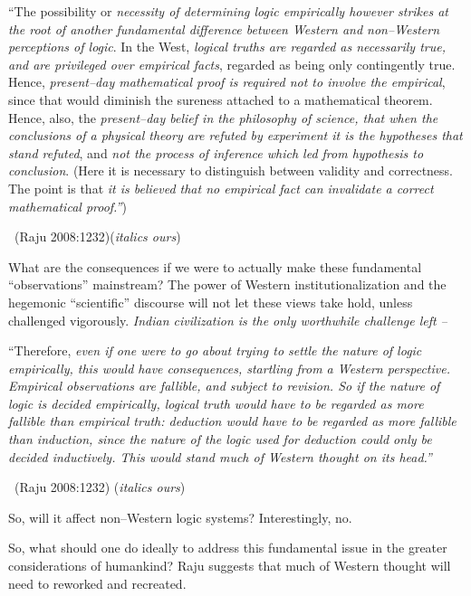 \begin{myquote}
“The possibility or \textit{necessity of determining logic empirically however strikes at the root of another fundamental difference between Western and non–Western perceptions of logic}. In the West, \textit{logical truths are regarded as necessarily true, and are privileged over empirical facts}, regarded as being only contingently true. Hence, \textit{present–day mathematical proof is required not to involve the empirical}, since that would diminish the sureness attached to a mathematical theorem. Hence, also, the \textit{present–day belief in the philosophy of science, that when the conclusions of a physical theory are refuted by experiment it is the hypotheses that stand refuted}, and \textit{not the process of inference which led from hypothesis to conclusion}. (Here it is necessary to distinguish between validity and correctness. The point is that \textit{it is believed that no empirical fact can invalidate a correct mathematical proof.”}) 

~\hfill (Raju 2008:1232)(\textit{italics ours})
\end{myquote}

What are the consequences if we were to actually make these fundamental “observations” mainstream? The power of Western institutionalization and the hegemonic “scientific” discourse will not let these views take hold, unless challenged vigorously. \textit{Indian civilization is the only worthwhile challenge left –}

\begin{myquote}
“Therefore, \textit{even if one were to go about trying to settle the nature of logic empirically, this would have consequences, startling from a Western perspective. Empirical observations are fallible, and subject to revision. So if the nature of logic is decided empirically, logical truth would have to be regarded as more fallible than empirical truth: deduction would have to be regarded as more fallible than induction, since the nature of the logic used for deduction could only be decided inductively. This would stand much of Western thought on its head.”} 

~\hfill (Raju 2008:1232) (\textit{italics ours})
\end{myquote}

So, will it affect non–Western logic systems? Interestingly, no.

So, what should one do ideally to address this fundamental issue in the greater considerations of humankind? Raju suggests that much of Western thought will need to reworked and recreated.

